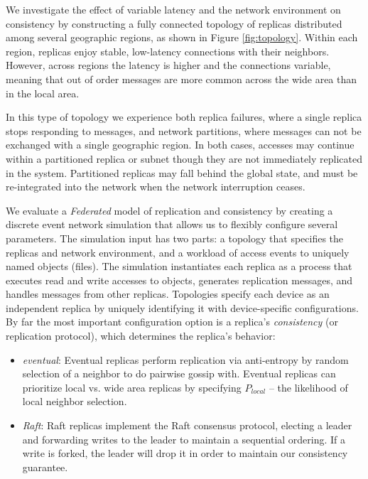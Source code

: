 \documentclass[10pt,conference,letterpaper]{IEEEtran}
\begin{document}
We investigate the effect of variable latency and the network environment on consistency by
constructing a fully connected topology of replicas distributed among several
geographic regions, as shown in Figure \ref{fig:topology}.
Within each region, replicas enjoy stable, low-latency connections with their
neighbors.
However, across regions the latency is higher and the connections variable, meaning that
out of order messages are more common across the wide area than in the local area.

In this type of topology we experience both
replica failures, where a single replica stops responding to
messages, and network partitions, where messages can not be exchanged
with a single geographic region.
In both cases, accesses may continue within a partitioned replica or subnet
though they are not immediately replicated in the system.
Partitioned replicas may fall behind the global state, and must be
re-integrated into the network when the network interruption ceases.


We evaluate a \emph{Federated} model of replication and consistency by creating a
discrete event network simulation that allows us to flexibly configure several parameters.
The simulation input has two parts: a topology that specifies the replicas and
network environment, and a workload of access events to uniquely named objects
(files).
The simulation instantiates each replica as a process that executes read and
write accesses to objects, generates replication messages, and
handles messages from other replicas.
Topologies specify each device as an independent replica by uniquely identifying it
with device-specific configurations.
By far the most important configuration option is a replica's \textit{consistency} (or replication
protocol), which determines the replica's behavior:
\begin{itemize}
    \item \emph{eventual}: Eventual replicas perform replication via anti-entropy by random
      selection of a neighbor to do pairwise gossip with. Eventual  replicas can prioritize
      local vs. wide area replicas by specifying $P_{local}$ -- the likelihood of local neighbor selection.
    \item \emph{Raft}: Raft replicas implement the Raft consensus protocol, electing a
      leader and forwarding writes to the leader to maintain a sequential  ordering. If a
      write is forked, the leader will drop it in order to maintain our consistency
      guarantee.
\end{itemize}
\end{document}
